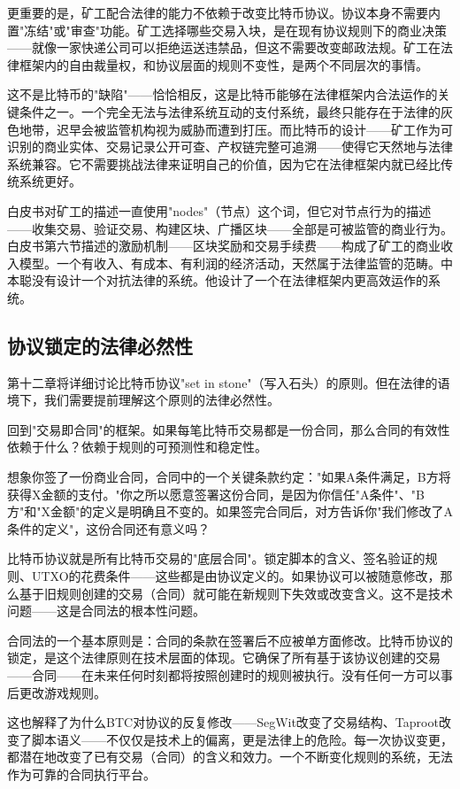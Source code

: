 \documentclass[a4paper,12pt,openany]{ctexbook}
\begin{document}
更重要的是，矿工配合法律的能力不依赖于改变比特币协议。协议本身不需要内置"冻结"或"审查"功能。矿工选择哪些交易入块，是在现有协议规则下的商业决策——就像一家快递公司可以拒绝运送违禁品，但这不需要改变邮政法规。矿工在法律框架内的自由裁量权，和协议层面的规则不变性，是两个不同层次的事情。

这不是比特币的"缺陷"——恰恰相反，这是比特币能够在法律框架内合法运作的关键条件之一。一个完全无法与法律系统互动的支付系统，最终只能存在于法律的灰色地带，迟早会被监管机构视为威胁而遭到打压。而比特币的设计——矿工作为可识别的商业实体、交易记录公开可查、产权链完整可追溯——使得它天然地与法律系统兼容。它不需要挑战法律来证明自己的价值，因为它在法律框架内就已经比传统系统更好。

白皮书对矿工的描述一直使用"nodes"（节点）这个词，但它对节点行为的描述——收集交易、验证交易、构建区块、广播区块——全部是可被监管的商业行为。白皮书第六节描述的激励机制——区块奖励和交易手续费——构成了矿工的商业收入模型。一个有收入、有成本、有利润的经济活动，天然属于法律监管的范畴。中本聪没有设计一个对抗法律的系统。他设计了一个在法律框架内更高效运作的系统。


\subsection*{协议锁定的法律必然性}


第十二章将详细讨论比特币协议"set in stone"（写入石头）的原则。但在法律的语境下，我们需要提前理解这个原则的法律必然性。

回到"交易即合同"的框架。如果每笔比特币交易都是一份合同，那么合同的有效性依赖于什么？依赖于规则的可预测性和稳定性。

想象你签了一份商业合同，合同中的一个关键条款约定："如果A条件满足，B方将获得X金额的支付。"你之所以愿意签署这份合同，是因为你信任"A条件"、"B方"和"X金额"的定义是明确且不变的。如果签完合同后，对方告诉你"我们修改了A条件的定义"，这份合同还有意义吗？

比特币协议就是所有比特币交易的"底层合同"。锁定脚本的含义、签名验证的规则、UTXO的花费条件——这些都是由协议定义的。如果协议可以被随意修改，那么基于旧规则创建的交易（合同）就可能在新规则下失效或改变含义。这不是技术问题——这是合同法的根本性问题。

合同法的一个基本原则是：合同的条款在签署后不应被单方面修改。比特币协议的锁定，是这个法律原则在技术层面的体现。它确保了所有基于该协议创建的交易——合同——在未来任何时刻都将按照创建时的规则被执行。没有任何一方可以事后更改游戏规则。

这也解释了为什么BTC对协议的反复修改——SegWit改变了交易结构、Taproot改变了脚本语义——不仅仅是技术上的偏离，更是法律上的危险。每一次协议变更，都潜在地改变了已有交易（合同）的含义和效力。一个不断变化规则的系统，无法作为可靠的合同执行平台。
\end{document}
